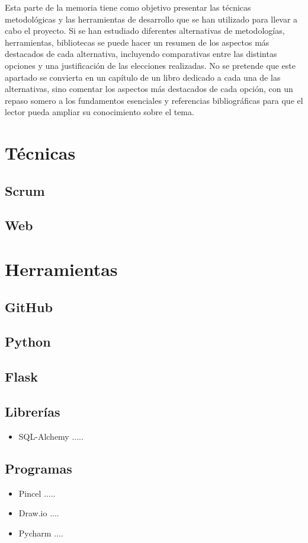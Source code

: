
Esta parte de la memoria tiene como objetivo presentar las técnicas metodológicas y las herramientas de desarrollo que se han utilizado para llevar a cabo el proyecto. Si se han estudiado diferentes alternativas de metodologías, herramientas, bibliotecas se puede hacer un resumen de los aspectos más destacados de cada alternativa, incluyendo comparativas entre las distintas opciones y una justificación de las elecciones realizadas. 
No se pretende que este apartado se convierta en un capítulo de un libro dedicado a cada una de las alternativas, sino comentar los aspectos más destacados de cada opción, con un repaso somero a los fundamentos esenciales y referencias bibliográficas para que el lector pueda ampliar su conocimiento sobre el tema.

\section{Técnicas}
\subsection{Scrum}
\subsection{Web}
\section{Herramientas}
\subsection{GitHub}
\subsection{Python}
\subsection{Flask}
\subsection{Librerías}
\begin{itemize}
\item SQL-Alchemy
.....
\end{itemize}

\subsection{Programas}
\begin{itemize}
\item Pincel
.....
\item Draw.io
....
\item Pycharm
....
\end{itemize}
\subsection{}
